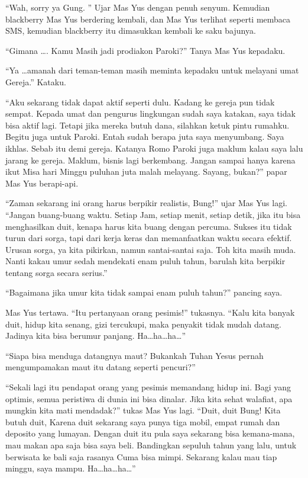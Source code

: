	``Wah, sorry ya Gung. '' Ujar Mas Yus dengan penuh senyum. Kemudian blackberry Mas Yus berdering kembali, dan Mas Yus terlihat seperti membaca SMS, kemudian blackberry itu dimasukkan kembali ke saku bajunya.

	``Gimana \ldots . Kamu Masih jadi prodiakon Paroki?'' Tanya Mas Yus kepadaku.

	``Ya \ldots  amanah dari teman-teman masih meminta kepadaku untuk melayani umat Gereja.'' Kataku.

	``Aku sekarang tidak dapat aktif seperti dulu. Kadang ke gereja pun tidak sempat. Kepada umat dan pengurus lingkungan sudah saya katakan, saya tidak bisa aktif lagi. Tetapi jika mereka butuh dana, silahkan ketuk pintu rumahku. Begitu juga untuk Paroki. Entah sudah berapa juta saya menyumbang. Saya ikhlas. Sebab itu demi gereja. Katanya Romo Paroki juga maklum kalau saya lalu jarang ke gereja. Maklum, bisnis lagi berkembang. Jangan sampai hanya karena ikut Misa hari Minggu puluhan juta malah melayang. Sayang, bukan?'' papar Mas Yus berapi-api.

	``Zaman sekarang ini orang harus berpikir realistis, Bung!'' ujar Mas Yus lagi. ``Jangan buang-buang waktu. Setiap Jam, setiap menit, setiap detik, jika itu bisa menghasilkan duit, kenapa harus kita buang dengan percuma. Sukses itu tidak turun dari sorga, tapi dari kerja keras dan memanfaatkan waktu secara efektif. Urusan sorga, ya kita pikirkan, namun santai-santai saja. Toh kita masih muda. Nanti kakau umur sedah mendekati enam puluh tahun, barulah kita berpikir tentang sorga secara serius.''

	``Bagaimana jika umur kita tidak sampai enam puluh tahun?'' pancing saya.

	Mas Yus tertawa. ``Itu pertanyaan orang pesimis!'' tukasnya. ``Kalu kita banyak duit, hidup kita senang, gizi tercukupi, maka penyakit tidak mudah datang. Jadinya kita bisa berumur panjang. Ha\ldots ha\ldots ha\ldots ''

	``Siapa bisa menduga datangnya maut? Bukankah Tuhan Yesus pernah mengumpamakan maut itu datang seperti pencuri?''

	``Sekali lagi itu pendapat orang yang pesimis memandang hidup ini. Bagi yang optimis, semua peristiwa di dunia ini bisa dinalar. Jika kita sehat walafiat, apa mungkin kita mati mendadak?'' tukas Mas Yus lagi. ``Duit, duit Bung! Kita butuh duit, Karena duit sekarang saya punya tiga mobil, empat rumah dan deposito yang lumayan. Dengan duit itu pula saya sekarang bisa kemana-mana, mau makan apa saja bisa saya beli. Bandingkan sepuluh tahun yang lalu, untuk berwisata ke bali saja rasanya Cuma bisa mimpi. Sekarang kalau mau tiap minggu, saya mampu. Ha\ldots ha\ldots ha\ldots ''

